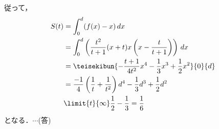 \documentclass[a4j]{jarticle}
\begin{document}
\begin{multicols}{2}
従って，
     \begin{align*}
     S(t)&=\int_0^d(f(x)-x)\,dx \\
     &=\int_0^d\left(\frac{t^2}{t+1}(x+t)x\left(x-\frac{t}{t+1}\right)\right)\,dx \\
     &=\teisekibun{-\frac{t+1}{4t^2}x^4-\frac{1}{3}x^3+\frac{1}{2}x^2}{0}{d} \\
     &=\frac{-1}{4}\left(\frac{1}{t}+\frac{1}{t^2}\right)d^4-\frac{1}{3}d^3+\frac{1}{2}d^2 \\
     &\limit{t}{\infty}\frac{1}{2}-\frac{1}{3}=\frac{1}{6}
     \end{align*}
となる．$\cdots$(答)

\newpage
\end{multicols}
\end{document}
